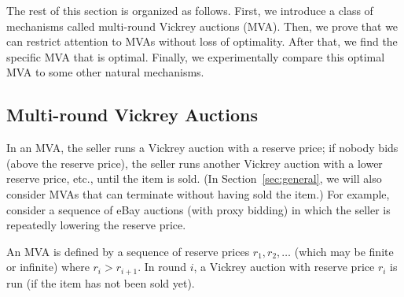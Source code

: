 The rest of this section is organized as follows. First, we
introduce a class of mechanisms called multi-round Vickrey auctions (MVA).
Then,
we prove that we can restrict attention to MVAs without loss of optimality.
After that, we find the specific MVA that is optimal. Finally, we
experimentally compare this optimal MVA to some other natural mechanisms.

\subsection{Multi-round Vickrey Auctions}


In an MVA, the seller runs a Vickrey auction with a reserve price; if
nobody bids (above the reserve price), the seller runs another Vickrey
auction with a lower reserve price, etc., until the item is sold.  (In
Section~\ref{sec:general}, we will also consider MVAs that can terminate
without having sold the item.)
For example, consider a sequence of eBay auctions (with proxy bidding) in
which the seller is repeatedly lowering the reserve price.



\begin{definition}
  An MVA is defined by a sequence of reserve prices $r_1, r_2, \ldots$
  (which may be finite or infinite) where $r_i > r_{i+1}$. In round $i$, a
  Vickrey auction with reserve price $r_i$ is run (if the item has not been
  sold yet).
\end{definition}


